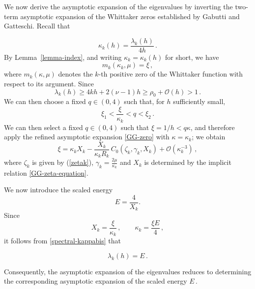 \documentclass[11pt]{amsart}
\numberwithin{equation}{section}
\theoremstyle{remark}
\newcommand{\mn}{\medskip\noindent}
\begin{document}
We now derive the asymptotic expansion of the eigenvalues by inverting
the two-term asymptotic expansion of the Whittaker zeros established by
Gabutti and Gatteschi. Recall that

\begin{equation}\label{spectral-kappabis}
\kappa_k(h)
=
\frac{\lambda_k(h)}{4h}\,.
\end{equation}
By Lemma~\ref{lemma-index}, and writing $\kappa_k=\kappa_k(h)$ for short, we have
\begin{equation}\label{spectral-zero}
m_k(\kappa_k,\mu)=\xi\,,
\end{equation}
where \(m_k(\kappa,\mu)\) denotes the \(k\)-th positive zero of the
Whittaker function with respect to its argument. Since 
\[\lambda_k(h)\geq 4kh+2(\nu-1)h\geq \rho_0+\mathcal O(h)>1\,.\]
We can then choose a fixed $q\in(0,4)$ such that, for $h$ sufficiently
small,
\[
\xi_1<\frac{\xi}{\kappa_k}<q<\xi_2\,.
\]
We can then select a fixed $q\in(0,4)$ such that $\xi=1/h<q\kappa$, and therefore apply the refined asymptotic expansion \eqref{GG-zero} with
\(\kappa=\kappa_k\); we obtain
\begin{equation}\label{spectral-mk}
\xi
=
\kappa_kX_k
-
\frac{X_k}{\kappa_kR_k}
\,C_0(\zeta_k,\gamma_k,X_k)
+
\mathcal O(\kappa_k^{-3})\,,
\end{equation}
where $\zeta_k$ is given by (\ref{zetak}), $ \gamma_k
=
\frac{2\mu}{\kappa_k}$ and  \(X_k\) is determined by the implicit relation
\eqref{GG-zeta-equation}. 

\mn 
We now introduce the scaled energy
\begin{equation}\label{scaled-energy}
E=\frac{4}{X_k}.
\end{equation}
Since
\begin{equation}\label{kappa-energy}
 X_k=\frac{\xi}{\kappa_k}\,,
\qquad
\kappa_k=\frac{\xi E}{4}\,,
\end{equation}
it follows from \eqref{spectral-kappabis} that

\begin{equation}\label{spectral-E}
\lambda_k(h) =E\,.
\end{equation}

Consequently, the asymptotic expansion of the eigenvalues reduces to
determining the corresponding asymptotic expansion of the scaled energy
\(E\)\,.
\end{document}
